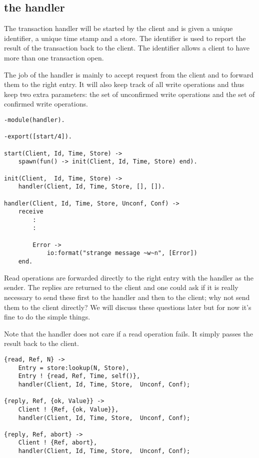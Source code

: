 \documentclass[a4paper, 11pt]{article}
\begin{document}
\subsection{the handler}

The transaction handler will be started by the client and is given a
unique identifier, a unique time stamp and a store. The identifier is
used to report the result of the transaction back to the client. The
identifier allows a client to have more than one transaction open. 

The job of the handler is mainly to accept request from the client and
to forward them to the right entry. It will also keep track of all
write operations and thus keep two extra parameters: the set of
unconfirmed write operations and the set of confirmed write
operations.


\begin{verbatim}
-module(handler).

-export([start/4]).

start(Client, Id, Time, Store) ->
    spawn(fun() -> init(Client, Id, Time, Store) end).

init(Client,  Id, Time, Store) ->
    handler(Client, Id, Time, Store, [], []).

handler(Client, Id, Time, Store, Unconf, Conf) ->           
    receive
        :
        :

        Error ->
            io:format("strange message ~w~n", [Error])
    end.
\end{verbatim}

Read operations are forwarded directly to the right entry with the
handler as the sender. The replies are returned to the client and one
could ask if it is really necessary to send these first to the handler
and then to the client; why not send them to the client directly? We
will discuss these questions later but for now it's fine to do the
simple things.

Note that the handler does not care if a read operation fails. It
simply passes the result back to the client.

\begin{verbatim}
{read, Ref, N} ->
    Entry = store:lookup(N, Store),
    Entry ! {read, Ref, Time, self()},
    handler(Client, Id, Time, Store,  Unconf, Conf);

{reply, Ref, {ok, Value}} ->
    Client ! {Ref, {ok, Value}},
    handler(Client, Id, Time, Store,  Unconf, Conf);        

{reply, Ref, abort} ->
    Client ! {Ref, abort},
    handler(Client, Id, Time, Store,  Unconf, Conf);        
\end{verbatim}
\end{document}
